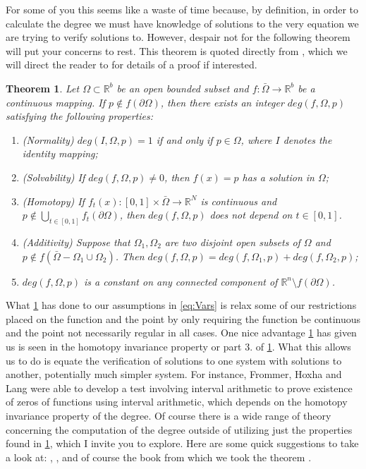\documentclass[11pt]{article}
\theoremstyle{plain}
\newtheorem{thm}{Theorem}[section]
\theoremstyle{definition}
\theoremstyle{remark}
\begin{document}
For some of you this seems like a waste of time because, by definition, in order to calculate the degree we must have knowledge of solutions to the very equation we are trying to verify solutions to. However, despair not for the following theorem will put your concerns to rest. 
This theorem is quoted directly from \cite{OrChCh2006}, which we will direct the reader to for details of a proof if interested. 

\begin{thm} \label{DegThm}
Let $\Omega\subset\mathbb{R}^b$ be an open bounded subset and $f:\bar{\Omega}\rightarrow\mathbb{R}^b$ be a continuous mapping. If $p\not\in f\left(\partial\Omega\right)$, then there exists an integer $deg\left(f, \Omega,p\right)$ satisfying the following properties:
\begin{enumerate}
\item (Normality) $deg\left(I, \Omega,p\right)=1$ if and only if $p\in\Omega$, where $I$ denotes the identity mapping;
\item (Solvability) If $deg\left(f, \Omega,p\right)\not= 0$, then $f(x)=p$ has a solution in $\Omega$;
\item (Homotopy) If $f_t(x):[0,1]\times\bar{\Omega}\rightarrow\mathbb{R}^N$ is continuous and $p\not\in \bigcup\limits_{t\in[0,1]}f_t\left(\partial\Omega\right)$, then $deg\left(f, \Omega,p\right)$ does not depend on $t\in[0,1]$. 
\item (Additivity) Suppose that $\Omega_1, \Omega_2$ are two disjoint open subsets of $\Omega$ and $p\not\in f\left(\bar{\Omega}-\Omega_1\cup\Omega_2\right)$. Then $deg\left(f, \Omega,p\right)=deg\left(f, \Omega_1,p\right)+deg\left(f, \Omega_2,p\right)$;
\item $deg\left(f, \Omega,p\right)$ is a constant on any connected component of $\mathbb{R}^n\setminus f(\partial\Omega)$. 
\end{enumerate}
\end{thm}

What \cref{DegThm} has done to our assumptions in \eqref{eq:Vars} is relax some of our restrictions placed on the function and the point by only requiring the function be continuous and the point not necessarily regular in all cases. One nice advantage \cref{DegThm} has given us is seen in the homotopy invariance property or part 3. of \cref{DegThm}. What this allows us to do is equate the verification of solutions to one system with solutions to another, potentially much simpler system. For instance, Frommer, Hoxha and Lang were able to develop a test involving interval arithmetic to prove existence of zeros of functions using interval arithmetic, which depends on the homotopy invariance property of the degree. \cite{FrHoLa2007} Of course there is a wide range of theory concerning the computation of the degree outside of utilizing just the properties found in \cref{DegThm}, which I invite you to explore. Here are some quick suggestions to take a look at: \cite{MoVrYa2002}, \cite{OnTh2006}, and of course the book from which we took the theorem \cite{OrChCh2006}.


\end{document}
